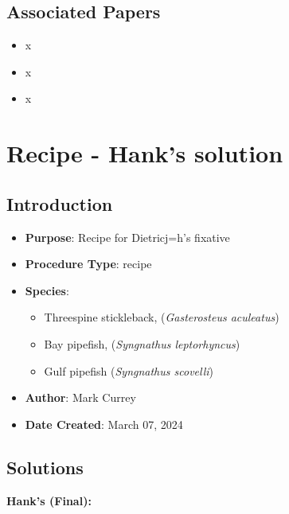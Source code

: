 \documentclass[
  letterpaper,
  DIV=11,
  numbers=noendperiod]{scrreprt}
\providecommand{\tightlist}{%
  \setlength{\itemsep}{0pt}\setlength{\parskip}{0pt}}\usepackage{longtable,booktabs,array}
\begin{document}
\hypertarget{associated-papers-78}{%
\section{Associated Papers}\label{associated-papers-78}}

\begin{itemize}
\tightlist
\item
  x
\item
  x
\item
  x
\end{itemize}

\hypertarget{sec-recipe-hanks}{%
\chapter{Recipe - Hank's solution}\label{sec-recipe-hanks}}

\hypertarget{introduction-110}{%
\section{Introduction}\label{introduction-110}}

\begin{itemize}
\tightlist
\item
  \textbf{Purpose}: Recipe for Dietricj=h's fixative\\
\item
  \textbf{Procedure Type}: recipe
\item
  \textbf{Species}:

  \begin{itemize}
  \tightlist
  \item
    Threespine stickleback, (\emph{Gasterosteus aculeatus})
  \item
    Bay pipefish, (\emph{Syngnathus leptorhyncus})
  \item
    Gulf pipefish (\emph{Syngnathus scovelli})
  \end{itemize}
\item
  \textbf{Author}: Mark Currey
\item
  \textbf{Date Created}: March 07, 2024
\end{itemize}

\hypertarget{solutions-96}{%
\section{Solutions}\label{solutions-96}}

\textbf{Hank's (Final):}
\end{document}
